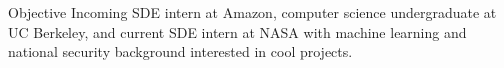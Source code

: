 \begin{rSection}{Objective}
Incoming SDE intern at Amazon, computer science undergraduate at UC Berkeley, and current SDE intern at NASA with machine learning and national security background interested in cool projects.
\end{rSection}